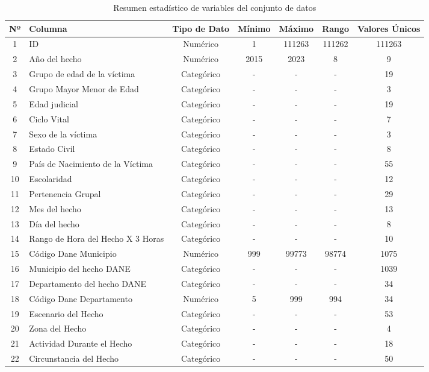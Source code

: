 \documentclass[lettersize,journal]{IEEEtran}
\begin{document}
\begin{table*}[htbp]
  \caption{Resumen estadístico de variables del conjunto de datos}
  \centering
  \begin{tabularx}{\textwidth}{|c|X|c|c|c|c|c|}
  \hline
  \textbf{Nº} & \textbf{Columna} & \textbf{Tipo de Dato} & \textbf{Mínimo} & \textbf{Máximo} & \textbf{Rango} & \textbf{Valores Únicos} \\
  \hline
  1 & ID & Numérico & 1 & 111263 & 111262 & 111263 \\
  2 & Año del hecho & Numérico & 2015 & 2023 & 8 & 9 \\
  3 & Grupo de edad de la víctima & Categórico & - & - & - & 19 \\
  4 & Grupo Mayor Menor de Edad & Categórico & - & - & - & 3 \\
  5 & Edad judicial & Categórico & - & - & - & 19 \\
  6 & Ciclo Vital & Categórico & - & - & - & 7 \\
  7 & Sexo de la víctima & Categórico & - & - & - & 3 \\
  8 & Estado Civil & Categórico & - & - & - & 8 \\
  9 & País de Nacimiento de la Víctima & Categórico & - & - & - & 55 \\
  10 & Escolaridad & Categórico & - & - & - & 12 \\
  11 & Pertenencia Grupal & Categórico & - & - & - & 29 \\
  12 & Mes del hecho & Categórico & - & - & - & 13 \\
  13 & Día del hecho & Categórico & - & - & - & 8 \\
  14 & Rango de Hora del Hecho X 3 Horas & Categórico & - & - & - & 10 \\
  15 & Código Dane Municipio & Numérico & 999 & 99773 & 98774 & 1075 \\
  16 & Municipio del hecho DANE & Categórico & - & - & - & 1039 \\
  17 & Departamento del hecho DANE & Categórico & - & - & - & 34 \\
  18 & Código Dane Departamento & Numérico & 5 & 999 & 994 & 34 \\
  19 & Escenario del Hecho & Categórico & - & - & - & 53 \\
  20 & Zona del Hecho & Categórico & - & - & - & 4 \\
  21 & Actividad Durante el Hecho & Categórico & - & - & - & 18 \\
  22 & Circunstancia del Hecho & Categórico & - & - & - & 50 \\

\end{tabularx}
\end{table*}
\end{document}
